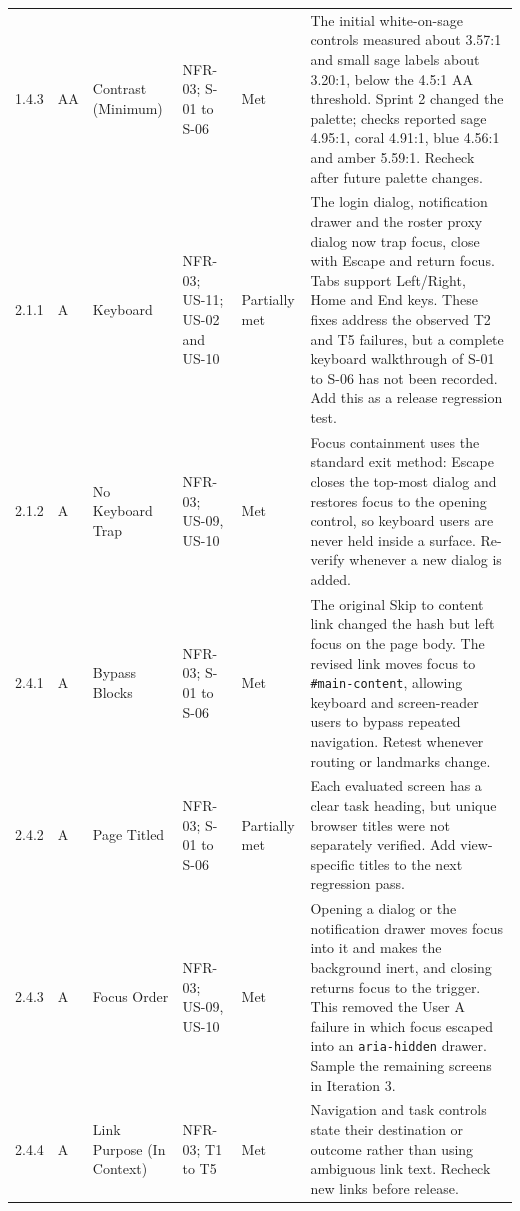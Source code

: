 \documentclass[11pt,a4paper]{article}
\begin{document}
{\begin{longtable}{@{}L{1.1cm}L{0.85cm}L{2.25cm}L{2.35cm}L{1.3cm}L{5.05cm}@{}}
    1.4.3 &
    AA &
    Contrast (Minimum) &
    NFR-03; S-01 to S-06 &
    Met &
    The initial white-on-sage controls measured about 3.57:1 and small sage
    labels about 3.20:1, below the 4.5:1 AA threshold. Sprint 2 changed the
    palette; checks reported sage 4.95:1, coral 4.91:1, blue 4.56:1
    and amber 5.59:1. Recheck after future palette changes.\\

    2.1.1 &
    A &
    Keyboard &
    NFR-03; US-11; US-02 and US-10 &
    Partially met &
    The login dialog, notification drawer and the roster proxy dialog now trap
    focus, close with Escape and return focus. Tabs support Left/Right, Home
    and End keys. These fixes address the observed T2 and T5 failures, but a
    complete keyboard walkthrough of S-01 to S-06 has not been recorded. Add
    this as a release regression test.\\

    2.1.2 &
    A &
    No Keyboard Trap &
    NFR-03; US-09, US-10 &
    Met &
    Focus containment uses the standard exit method: Escape closes the
    top-most dialog and restores focus to the opening control, so keyboard
    users are never held inside a surface. Re-verify whenever a new dialog is
    added.\\

    2.4.1 &
    A &
    Bypass Blocks &
    NFR-03; S-01 to S-06 &
    Met &
    The original Skip to content link changed the hash but left focus on the
    page body. The revised link moves focus to \texttt{\#main-content}, allowing
    keyboard and screen-reader users to bypass repeated navigation. Retest
    whenever routing or landmarks change.\\

    2.4.2 &
    A &
    Page Titled &
    NFR-03; S-01 to S-06 &
    Partially met &
    Each evaluated screen has a clear task heading, but unique browser titles
    were not separately verified. Add view-specific titles to the next
    regression pass.\\

    2.4.3 &
    A &
    Focus Order &
    NFR-03; US-09, US-10 &
    Met &
    Opening a dialog or the notification drawer moves focus into it and makes
    the background inert, and closing returns focus to the trigger. This
    removed the User A failure in which focus escaped into an
    \texttt{aria-hidden} drawer. Sample the remaining screens in Iteration 3.\\

    2.4.4 &
    A &
    Link Purpose (In Context) &
    NFR-03; T1 to T5 &
    Met &
    Navigation and task controls state their destination or outcome rather
    than using ambiguous link text. Recheck new links before release.\\


\end{longtable}}
\end{document}
